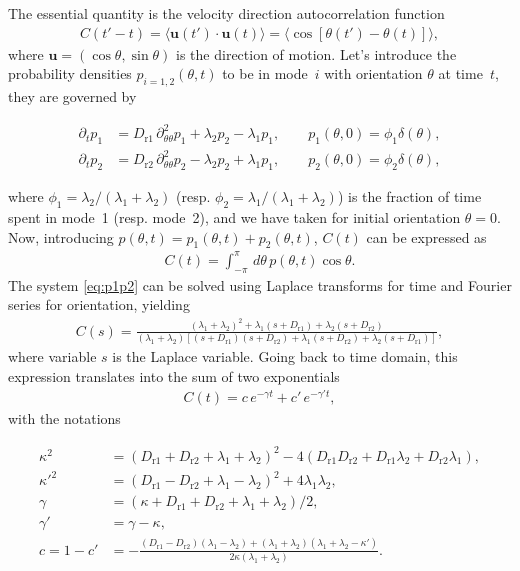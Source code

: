 \documentclass[11pt, twocolumn]{article}
\newcommand{\Dru}{{D_{\mathrm{r1}}}}
\newcommand{\Drd}{{D_{\mathrm{r2}}}}
\newcommand{\lamu}{\lambda_1}
\newcommand{\lamd}{\lambda_2}
\newcommand{\pru}{p_1}
\newcommand{\prd}{p_2}
\newcommand{\be}{\begin{eqnarray}}
\newcommand{\ee}{\end{eqnarray}}
\newcommand{\vc}[1]{\mathbf{#1}}
\newcommand{\vcu}{\vc{u}}
\newcommand{\C}{C}
\begin{document}
The essential quantity  is the velocity direction autocorrelation function
\be
\C(t'-t) =  \langle  \vcu(t')\cdot \vcu(t)\rangle  =  \langle \cos \left[ \theta(t') - \theta(t)  \right]\rangle,  
\ee
where $\vcu = (\cos \theta, \sin \theta)$ is the direction of motion. 
%
Let's introduce the probability densities  $p_{i=1,2}(\theta,t)$  to be in mode~$i$ with orientation $\theta$ at time~$t$, 
they are governed by
\begin{linenomath}
\begin{subequations}
\label{eq:p1p2}
\begin{align}
\partial_t \pru &= \Dru\, \partial^2_{\theta\theta}\pru + \lamd \prd - \lamu \pru,  \qquad  \pru(\theta,0)=\phi_1 \delta(\theta),    \label{eq:p1p2a}\\ 
\partial_t \prd &= \Drd\,\partial^2_{\theta\theta} \prd - \lamd \prd + \lamu \pru,  \qquad  \prd(\theta,0)=\phi_2    \delta(\theta), \label{eq:p1p2b}
\end{align}
\end{subequations}
\end{linenomath}
where $\phi_1 = \lamd/(\lamu + \lamd)$ (resp.
$\phi_2 = \lamu/(\lamu + \lamd)$) is the fraction of time spent in
mode~1 (resp. mode~2), and we have taken for initial orientation
$\theta=0$.  Now, introducing
$p(\theta,t)=\pru(\theta,t)+\prd(\theta,t)$, $\C(t)$ can be expressed
as \be \C(t) = \int_{-\pi}^{\pi}\, d\theta \, p(\theta,t) \cos\theta.
\ee The system \eqref{eq:p1p2} can be solved using Laplace transforms
for time and Fourier series for orientation, yielding \be \C(s) =
\frac{ (\lamu + \lamd)^2 + \lamu (s+\Dru) + \lamd (s+\Drd)} {(\lamu +
  \lamd) \left[ (s+\Dru)(s+\Drd) +\lamu (s+\Drd) + \lamd (s+\Dru)
  \right]}, \nonumber \ee where variable $s$ is the Laplace variable.
Going back to time domain, this expression translates into the sum of
two exponentials \be \C(t) = c\, e^{-\gamma t} + c'\, e^{-\gamma' t},
\label{eq:corr_francois}   
\ee
with the notations
\begin{linenomath}
\begin{subequations}
\label{eq:corr_params}
\begin{align}
\kappa^2  &= (\Dru+\Drd + \lamu + \lamd)^2 - 4 (\Dru \Drd + \Dru \lamd + \Drd \lamu ),            \\
\kappa'^2 &= (\Dru-\Drd + \lamu - \lamd)^2 + 4 \lamu  \lamd,                                      \\
\gamma    &= (\kappa +\Dru+\Drd + \lamu + \lamd )/2,                                              \\
\gamma'   &= \gamma - \kappa,                                                                     \\
c=1-c'    &= - \frac{\left(\Dru-\Drd\right) \left(\lamu-\lamd\right)+\left(\lamu+\lamd\right) \left(\lamu+\lamd -\kappa' \right)}{2 \kappa  \left(\lamu+\lamd\right)}.                           
\label{eq:c_prime}
\end{align}
\end{subequations}
\end{linenomath}
\end{document}
